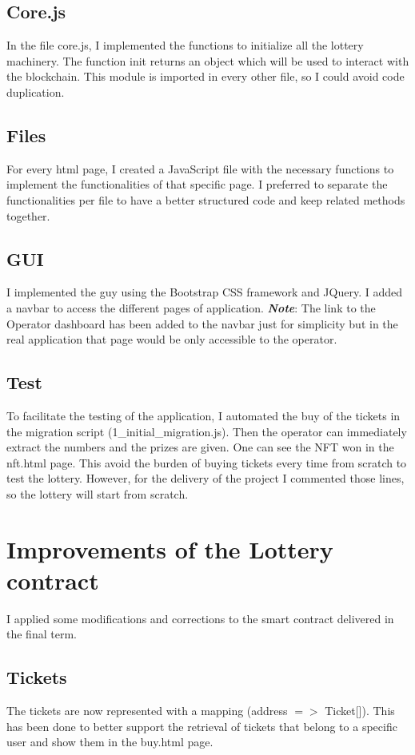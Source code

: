 \documentclass[11pt]{article}
\begin{document}
\subsection{Core.js}
In the file core.js, I implemented the functions to initialize all the lottery machinery.
The function init returns an object which will be used to interact
with the blockchain. This module is imported in every other file, so I could avoid
code duplication.
\subsection{Files}
For every html page, I created a JavaScript file with the necessary functions to implement
the functionalities of that specific page. I preferred
to separate the functionalities per file to have a better structured code
and keep related methods together.

\subsection{GUI}
I implemented the guy using the Bootstrap CSS framework and JQuery. I added a navbar to access the different pages of application.
\textit{\textbf{Note}}: The link to the Operator dashboard has been added to the navbar just for simplicity but
in the real application that page would be only accessible to the operator.
\subsection{Test}
To facilitate the testing of the application, I automated the buy of the tickets in the migration script
(1\_initial\_migration.js). Then the operator can immediately extract the numbers and the prizes are given. One
can see the NFT won in the nft.html page. This avoid the burden of buying tickets
every time from scratch to test the lottery. However, for the delivery of the project
I commented those lines, so the lottery will start from scratch.

\section{Improvements of the Lottery contract}
I applied some modifications and corrections to the smart contract delivered in the final term.
\subsection*{Tickets}
The tickets are now represented with a mapping (address $=>$ Ticket[]). This has been done to
better support the retrieval of tickets that belong to a specific user and show them in the buy.html page.
\end{document}
